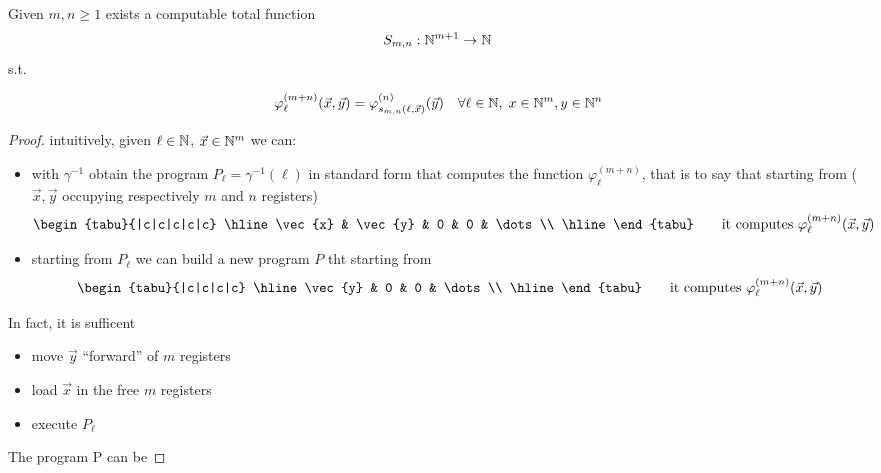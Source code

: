 \begin{theorem}
  Given $m, n \geq 1$ exists a computable total function
  \[S_{m,n} : \mathbb{N}^{m+1} \rightarrow \mathbb{N}\] s.t.

  \[
    \varphi_\ell^{(m+n)}(\vec{x},\vec{y}) = \varphi_{s_{m,n}(\ell,
      \vec{x})}^{(n)}(\vec{y}) \quad \forall \ell \in \mathbb{N}, \; x \in
    \mathbb{N}^m, y \in \mathbb{N}^n
  \]

  \begin{proof}
    intuitively, given $\ell \in \mathbb{N}$, $\vec{x}\in \mathbb{N}^m$ we can:
    \begin{itemize}
    \item with $\gamma^{-1}$ obtain the program
      $P_\ell = \gamma^{-1}(\ell)$ in standard form that computes the
      function $\varphi_\ell^{(m+n)}$, that is to say that starting
      from ( $\vec{x}, \vec{y}$ occupying respectively $m$ and $n$
      registers)
      \[
        \begin{tabu}{|c|c|c|c|c}
          \hline
          \vec{x} & \vec{y} & 0 & 0 & \dots \\ \hline
        \end{tabu}
        \quad \quad \mbox{it computes }
        \varphi_\ell^{(m+n)}(\vec{x},\vec{y})
      \]
    \item starting from $P_\ell$ we can build a new program $P$ tht
      starting from
      \[
        \begin{tabu}{|c|c|c|c}
          \hline
          \vec{y} & 0 & 0 & \dots \\ \hline
        \end{tabu}
        \quad \quad \mbox{it computes }
        \varphi_\ell^{(m+n)}(\vec{x},\vec{y})
      \]
    \end{itemize}

    In fact, it is sufficent
    \begin{itemize}
    \item move $\vec{y}$ ``forward'' of $m$ registers
    \item load $\vec{x}$ in the free $m$ registers
    \item execute $P_\ell$
    \end{itemize}
    
    The program P can be


\end{proof}
\end{theorem}
